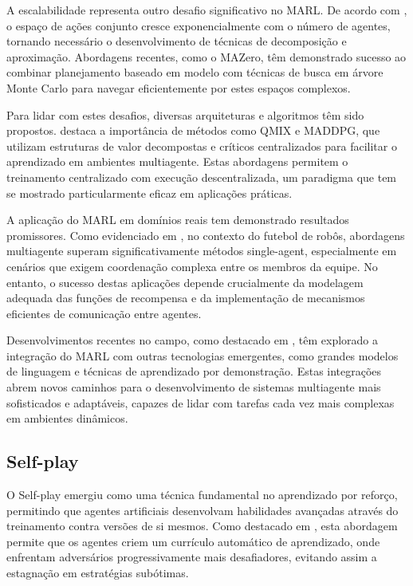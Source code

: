 A escalabilidade representa outro desafio significativo no MARL. De acordo com \cite{https://openreview.net/forum?id=CpnKq3UJwp}, o espaço de ações conjunto cresce exponencialmente com o número de agentes, tornando necessário o desenvolvimento de técnicas de decomposição e aproximação. Abordagens recentes, como o MAZero, têm demonstrado sucesso ao combinar planejamento baseado em modelo com técnicas de busca em árvore Monte Carlo para navegar eficientemente por estes espaços complexos.

Para lidar com estes desafios, diversas arquiteturas e algoritmos têm sido propostos. \cite{https://www.maxwell.vrac.puc-rio.br/21194/21194_3.PDF} destaca a importância de métodos como QMIX e MADDPG, que utilizam estruturas de valor decompostas e críticos centralizados para facilitar o aprendizado em ambientes multiagente. Estas abordagens permitem o treinamento centralizado com execução descentralizada, um paradigma que tem se mostrado particularmente eficaz em aplicações práticas.

A aplicação do MARL em domínios reais tem demonstrado resultados promissores. Como evidenciado em \cite{https://bdtd.ibict.br/vufind/Record/UFPE_b675a4ea6b1a1cb60a873b1d5bc3f9b2}, no contexto do futebol de robôs, abordagens multiagente superam significativamente métodos single-agent, especialmente em cenários que exigem coordenação complexa entre os membros da equipe. No entanto, o sucesso destas aplicações depende crucialmente da modelagem adequada das funções de recompensa e da implementação de mecanismos eficientes de comunicação entre agentes.

Desenvolvimentos recentes no campo, como destacado em \cite{https://arxiv.org/abs/2312.10256}, têm explorado a integração do MARL com outras tecnologias emergentes, como grandes modelos de linguagem e técnicas de aprendizado por demonstração. Estas integrações abrem novos caminhos para o desenvolvimento de sistemas multiagente mais sofisticados e adaptáveis, capazes de lidar com tarefas cada vez mais complexas em ambientes dinâmicos.

\subsection{Self-play}
\label{subsec:self_play}

O Self-play emergiu como uma técnica fundamental no aprendizado por reforço, permitindo que agentes artificiais desenvolvam habilidades avançadas através do treinamento contra versões de si mesmos. Como destacado em \cite{https://en.wikipedia.org/wiki/self-play}, esta abordagem permite que os agentes criem um currículo automático de aprendizado, onde enfrentam adversários progressivamente mais desafiadores, evitando assim a estagnação em estratégias subótimas.

